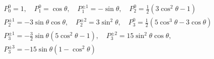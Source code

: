 \begin{footnotesize}
    \noindent\begin{gather*}
        P_{0}^{0}=1, \quad P_{1}^{0}=\cos\theta, \quad P_{1}^{\pm 1} =-\sin\theta, \quad P_{2}^{0} =\frac{1}{2}(3 \cos^{2}\theta-1)\\
        P_{2}^{\pm 1} =-3 \sin\theta\cos\theta, \quad P_{2}^{\pm 2} =3 \sin^{2}\theta, \quad P_{3}^{0} =\frac{1}{2} (5 \cos^{3}\theta-3 \cos\theta) \\
        P_{3}^{\pm 1}  =-\frac{3}{2}\sin\theta (5 \cos^{2}\theta-1),\quad P_{3}^{\pm 2}  =15 \sin^{2}\theta \cos\theta,\\
        P_{3}^{\pm 3}  =-15 \sin\theta(1-\cos^{2}\theta)
    \end{gather*}
\end{footnotesize}